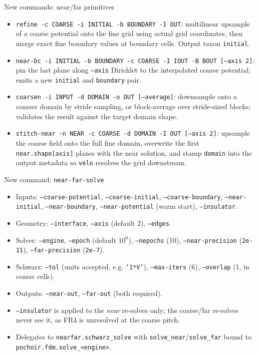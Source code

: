 \documentclass[10pt,aspectratio=169]{beamer}
\newcommand{\ti}[1]{\texttt{\footnotesize #1}}
\begin{document}
\begin{frame}{New commands: near/far primitives}
  \begin{itemize}\small
  \item \ti{refine -c COARSE -i INITIAL -b BOUNDARY -I OUT}: multilinear upsample of a
        coarse potential onto the fine grid using actual grid coordinates, then merge exact
        fine boundary values at boundary cells. Output taxon \ti{initial}.
  \item \ti{near-bc -i INITIAL -b BOUNDARY -c COARSE -I IOUT -B BOUT [--axis 2]}: pin the
        last plane along \ti{--axis} Dirichlet to the interpolated coarse potential; emits a
        new \ti{initial} and \ti{boundary} pair.
  \item \ti{coarsen -i INPUT -d DOMAIN -o OUT [--average]}: downsample onto a coarser
        domain by stride sampling, or block-average over stride-sized blocks; validates the
        result against the target domain shape.
  \item \ti{stitch-near -n NEAR -c COARSE -d DOMAIN -I OUT [--axis 2]}: upsample the coarse
        field onto the full fine domain, overwrite the first \ti{near.shape[axis]} planes
        with the near solution, and stamp \ti{domain} into the output metadata so \ti{velo}
        resolves the grid downstream.
  \end{itemize}
\end{frame}

\begin{frame}{New command: \texttt{near-far-solve}}
  \begin{itemize}\small
  \item Inputs: \ti{--coarse-potential}, \ti{--coarse-initial}, \ti{--coarse-boundary},
        \ti{--near-initial}, \ti{--near-boundary}, \ti{--near-potential} (warm start),
        \ti{--insulator}.
  \item Geometry: \ti{--interface}, \ti{--axis} (default 2), \ti{--edges}.
  \item Solver: \ti{--engine}, \ti{--epoch} (default $10^6$), \ti{--nepochs} (10),
        \ti{--near-precision} (\ti{2e-11}), \ti{--far-precision} (\ti{2e-7}).
  \item Schwarz: \ti{--tol} (units accepted, e.g. \ti{'1*V'}), \ti{--max-iters} (6),
        \ti{--overlap} (1, in coarse cells).
  \item Outputs: \ti{--near-out}, \ti{--far-out} (both required).
  \item \ti{--insulator} is applied to the \emph{near} re-solves only; the coarse/far
        re-solves never see it, as FR4 is unresolved at the coarse pitch.
  \item Delegates to \ti{nearfar.schwarz\_solve} with \ti{solve\_near}/\ti{solve\_far} bound
        to \ti{pochoir.fdm.solve\_<engine>}.
  \end{itemize}
\end{frame}
\end{document}
